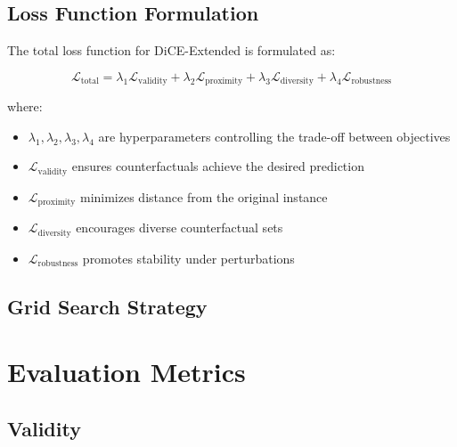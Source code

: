 \documentclass{article}
\begin{document}

\subsection{Loss Function Formulation}
\label{subsec:loss-function}

The total loss function for DiCE-Extended is formulated as:

\begin{equation}
\mathcal{L}_{\text{total}} = \lambda_1 \mathcal{L}_{\text{validity}} + \lambda_2 \mathcal{L}_{\text{proximity}} + \lambda_3 \mathcal{L}_{\text{diversity}} + \lambda_4 \mathcal{L}_{\text{robustness}}
\end{equation}

where:
\begin{itemize}
    \item $\lambda_1, \lambda_2, \lambda_3, \lambda_4$ are hyperparameters controlling the trade-off between objectives
    \item $\mathcal{L}_{\text{validity}}$ ensures counterfactuals achieve the desired prediction
    \item $\mathcal{L}_{\text{proximity}}$ minimizes distance from the original instance
    \item $\mathcal{L}_{\text{diversity}}$ encourages diverse counterfactual sets
    \item $\mathcal{L}_{\text{robustness}}$ promotes stability under perturbations
\end{itemize}

\subsection{Grid Search Strategy}
\label{subsec:grid-search}


\section{Evaluation Metrics}
\label{sec:evaluation-metrics}

\subsection{Validity}
\label{subsec:validity}
\end{document}
